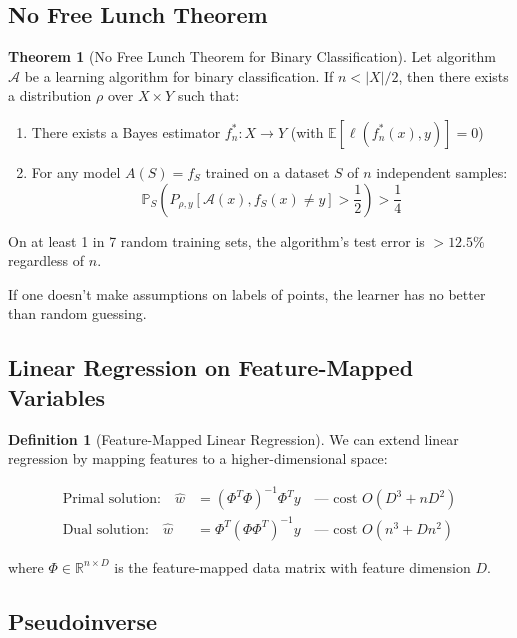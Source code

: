 \documentclass[12pt,a4paper]{article}
\theoremstyle{definition}
\newtheorem{definition}{Definition}[section]
\newtheorem{theorem}{Theorem}[section]
\begin{document}
\subsection{No Free Lunch Theorem}

\begin{theorem}[No Free Lunch Theorem for Binary Classification]
Let algorithm $\mathcal{A}$ be a learning algorithm for binary classification. If $n < |X|/2$, then there exists a distribution $\rho$ over $X \times Y$ such that:

\begin{enumerate}
    \item There exists a Bayes estimator $f_n^* : X \to Y$ (with $\mathbb{E}[\ell(f_n^*(x), y)] = 0$)
    
    \item For any model $A(S) = f_S$ trained on a dataset $S$ of $n$ independent samples:
    \[
    \mathbb{P}_S(P_{\rho,y}[\mathcal{A}(x), f_S(x) \neq y] > \frac{1}{2}) > \frac{1}{4}
    \]
\end{enumerate}

On at least 1 in 7 random training sets, the algorithm's test error is $> 12.5\%$ regardless of $n$. 

If one doesn't make assumptions on labels of points, the learner has no better than random guessing.
\end{theorem}

\subsection{Linear Regression on Feature-Mapped Variables}

\begin{definition}[Feature-Mapped Linear Regression]
We can extend linear regression by mapping features to a higher-dimensional space:

\begin{align*}
\text{Primal solution:} \quad \hat{w} &= (\Phi^T \Phi)^{-1} \Phi^T y \quad \text{— cost } O(D^3 + nD^2)\\
\text{Dual solution:} \quad \hat{w} &= \Phi^T (\Phi \Phi^T)^{-1} y \quad \text{— cost } O(n^3 + Dn^2)
\end{align*}

where $\Phi \in \mathbb{R}^{n \times D}$ is the feature-mapped data matrix with feature dimension $D$.
\end{definition}

\subsection{Pseudoinverse}
\end{document}
